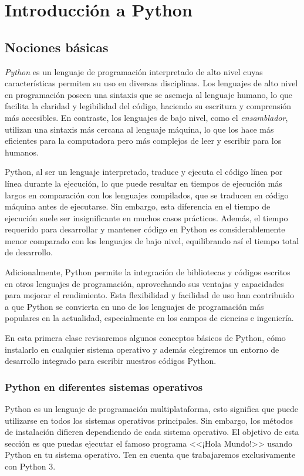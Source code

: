 \chapter{Introducción a Python}

\section{Nociones básicas}
\emph{Python} es un lenguaje de programación interpretado de alto nivel cuyas características permiten su uso en diversas disciplinas. Los lenguajes de alto nivel en programación poseen una sintaxis que se asemeja al lenguaje humano, lo que facilita la claridad y legibilidad del código, haciendo su escritura y comprensión más accesibles. En contraste, los lenguajes de bajo nivel, como el \emph{ensamblador}, utilizan una sintaxis más cercana al lenguaje máquina, lo que los hace más eficientes para la computadora pero más complejos de leer y escribir para los humanos.

Python, al ser un lenguaje interpretado, traduce y ejecuta el código línea por línea durante la ejecución, lo que puede resultar en tiempos de ejecución más largos en comparación con los lenguajes compilados, que se traducen en código máquina antes de ejecutarse. Sin embargo, esta diferencia en el tiempo de ejecución suele ser insignificante en muchos casos prácticos. Además, el tiempo requerido para desarrollar y mantener código en Python es considerablemente menor comparado con los lenguajes de bajo nivel, equilibrando así el tiempo total de desarrollo.

Adicionalmente, Python permite la integración de bibliotecas y códigos escritos en otros lenguajes de programación, aprovechando sus ventajas y capacidades para mejorar el rendimiento. Esta flexibilidad y facilidad de uso han contribuido a que Python se convierta en uno de los lenguajes de programación más populares en la actualidad, especialmente en los campos de ciencias e ingeniería.

En esta primera clase revisaremos algunos conceptos básicos de Python, cómo instalarlo en cualquier sistema operativo y además elegiremos un entorno de desarrollo integrado para escribir nuestros códigos Python. 

\subsection{Python en diferentes sistemas operativos}
Python es un lenguaje de programación multiplataforma, esto significa que puede utilizarse en todos los sistemas operativos principales. Sin embargo, los métodos de instalación difieren dependiendo de cada sistema operativo. El objetivo de esta sección es que puedas ejecutar el famoso programa <<¡Hola Mundo!>> usando Python en tu sistema operativo. Ten en cuenta que trabajaremos exclusivamente con Python 3.


